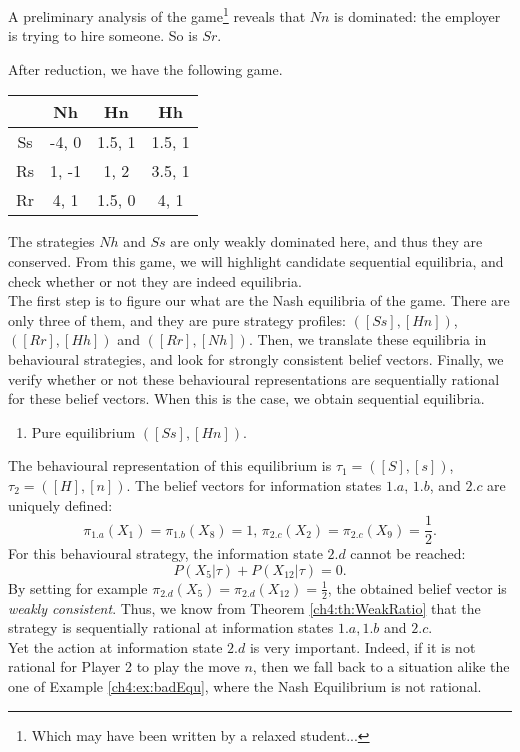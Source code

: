 \begin{example}
A preliminary analysis of the game\footnote{Which may have been written by a relaxed student...} reveals that $Nn$ is dominated: the employer is trying to hire someone. So is $Sr$.


After reduction, we have the following game.
\begin{center}
\begin{tabular}{c|ccc}
  & Nh  & Hn & Hh \\
\hline
Ss  & -4, 0 & 1.5, 1 & 1.5, 1 \\
Rs  &  1, -1 & 1, 2& 3.5, 1 \\
Rr  &  4, 1  & 1.5, 0 & 4, 1 \\
\end{tabular}
\end{center}
 The strategies $Nh$ and $Ss$ are only weakly dominated here, and thus they are conserved. From this game, we will highlight candidate sequential equilibria, and check whether or not they are indeed equilibria.\\
  The first step is to figure our what are the Nash equilibria of the game. There are only three of them, and they are pure strategy profiles: $([Ss], [Hn])$,  $([Rr], [Hh])$ and $([Rr] , [Nh])$.
Then, we translate these equilibria in behavioural strategies, and look for strongly consistent belief vectors. Finally, we verify whether or not these behavioural representations are sequentially rational for these belief vectors. When this is the case, we obtain sequential equilibria.
\begin{enumerate}
\item Pure equilibrium $([Ss], [Hn])$.
\end{enumerate}
The behavioural representation of this equilibrium is $\tau_1 = ([S],[s])$, $\tau_2 = ([H],[n])$.
The belief vectors for information states $1.a$, $1.b$, and $2.c$ are uniquely defined:
$$
\pi_{1.a}(X_1) = \pi_{1.b}(X_8) =1, \,  \pi_{2.c}(X_2) = \pi_{2.c}(X_9) = \frac{1}{2}.
$$
For this behavioural strategy, the information state $2.d$ cannot be reached:
$$P(X_5 | \tau) + P(X_{12} | \tau) = 0. $$
By setting for example $\pi_{2.d}(X_5) = \pi_{2.d}(X_{12}) = \frac{1}{2}$, the obtained belief vector is \emph{weakly consistent}. Thus, we know from Theorem \ref{ch4:th:WeakRatio} that the strategy is sequentially rational at information states $1.a, 1.b$ and $2.c$.\\
Yet the action at information state $2.d$ is very important. Indeed, if it is not rational for Player 2 to play the move $n$, then we fall back to a situation alike the one of Example \ref{ch4:ex:badEqu}, where the Nash Equilibrium is not rational.\\

\end{example}
